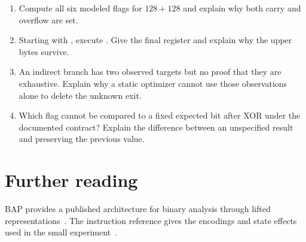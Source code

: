\begin{enumerate}
\item\label{ex:ch64-add} Compute all six modeled flags for $128+128$ and explain why both carry and overflow are set.
\item\label{ex:ch64-partial} Starting with , execute .
Give the final register and explain why the upper bytes survive.
\item\label{ex:ch64-unknown} An indirect branch has two observed targets but no proof that they are exhaustive.
Explain why a static optimizer cannot use those observations alone to delete the unknown exit.
\item\label{ex:ch64-xor} Which flag cannot be compared to a fixed expected bit after XOR under the documented contract?
Explain the difference between an unspecified result and preserving the previous value.
\end{enumerate}

\section{Further reading}
\label{sec:ch64-reading}

BAP provides a published architecture for binary analysis through lifted representations~\cite{brumley-2011-bap}.
The instruction reference gives the encodings and state effects used in the small experiment~\cite{cloutier-2026-x86}.
